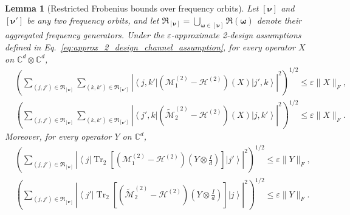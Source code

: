 \documentclass[%
 reprint,
 amsmath,amssymb,
 aps,
 pra,
]{revtex4-2}
\newtheorem{lemma}[theorem]{Lemma}
\theoremstyle{definition}
\begin{document}
\begin{lemma}[Restricted Frobenius bounds over frequency orbits]
\label{lemma:orbit_restricted_frobenius}
Let $[\bm{\nu}]$ and $[\bm{\nu}']$ be any two frequency orbits, and let $\mathfrak R_{[\bm{\nu}]} = \bigcup_{\bm{\omega}\in[\bm{\nu}]} \mathfrak R(\bm{\omega})$ denote their aggregated frequency generators. Under the $\varepsilon$-approximate 2-design assumptions defined in Eq.~\eqref{eq:approx_2_design_channel_assumption}, for every operator $X$ on $\mathbb C^d\otimes\mathbb C^d$,
\begin{align}
&
\left(
\sum_{(j,j')\in\mathfrak R_{[\bm{\nu}]}}
\sum_{(k,k')\in\mathfrak R_{[\bm{\nu}']}}
\left|
\left\langle j,k'\right|
\left(
\mathcal M^{(2)}_1-\mathcal H^{(2)}
\right)(X)
\left|j',k\right\rangle
\right|^2
\right)^{1/2}
\leq
\varepsilon\|X\|_F,
\label{eq:orbit_restricted_bound_M1}
\\
&
\left(
\sum_{(j,j')\in\mathfrak R_{[\bm{\nu}]}}
\sum_{(k,k')\in\mathfrak R_{[\bm{\nu}']}}
\left|
\left\langle j',k\right|
\left(
\widetilde{\mathcal M}^{(2)}_2-\mathcal H^{(2)}
\right)(X)
\left|j,k'\right\rangle
\right|^2
\right)^{1/2}
\leq
\varepsilon\|X\|_F.
\label{eq:orbit_restricted_bound_M2}
\end{align}
Moreover, for every operator $Y$ on $\mathbb C^d$,
\begin{align}
&
\left(
\sum_{(j,j')\in\mathfrak R_{[\bm{\nu}]}}
\left|
\left\langle j\right|
\operatorname{Tr}_2
\left[
\left(
\mathcal M^{(2)}_1-\mathcal H^{(2)}
\right)
\left(
Y\otimes\frac{I}{d}
\right)
\right]
\left|j'\right\rangle
\right|^2
\right)^{1/2}
\leq
\varepsilon\|Y\|_F,
\label{eq:orbit_partial_trace_bound_M1}
\\
&
\left(
\sum_{(j,j')\in\mathfrak R_{[\bm{\nu}]}}
\left|
\left\langle j'\right|
\operatorname{Tr}_2
\left[
\left(
\widetilde{\mathcal M}^{(2)}_2-\mathcal H^{(2)}
\right)
\left(
Y\otimes\frac{I}{d}
\right)
\right]
\left|j\right\rangle
\right|^2
\right)^{1/2}
\leq
\varepsilon\|Y\|_F.
\label{eq:orbit_partial_trace_bound_M2}
\end{align}
\end{lemma}
\end{document}
